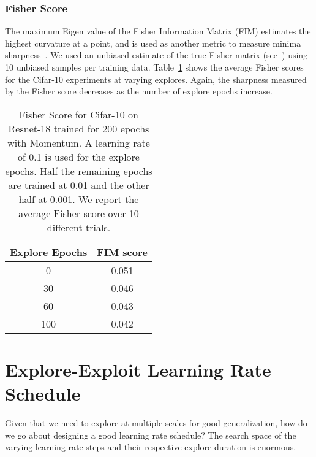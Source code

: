 \documentclass[twoside,11pt]{article}
\begin{document}
\subsubsection{\textbf{Fisher Score}}
The maximum Eigen value of the Fisher Information Matrix (FIM) estimates the highest curvature at a point, and is used as another metric to measure minima sharpness~\citep{fim2018information}. We used an unbiased estimate of the true Fisher matrix (see~\cite{empiricalfisher2019limitations}) using 10 unbiased samples per training data. Table~\ref{tab:fim_scores} shows the average Fisher scores for the Cifar-10 experiments at varying explores. Again, the sharpness measured by the Fisher score decreases as the number of explore epochs increase.

\begin{table}[hbt!]
\begin{minipage}{.6\textwidth}
    \caption{Fisher Score for Cifar-10 on Resnet-18 trained for 200
epochs with Momentum. A learning rate of 0.1 is used for the explore epochs. Half the remaining epochs are trained at 0.01 and the other half at 0.001. We report the average Fisher score over 10 different trials.}
\label{tab:fim_scores}
\end{minipage}\hfill
\begin{minipage}{.35\textwidth}\vspace*{0pt}\begin{tabular}{cc}
  \toprule
  Explore Epochs      &  FIM score   \\
\midrule
  0 & 0.051\\
  30 & 0.046\\
  60 & 0.043\\
  100 & 0.042\\
 \bottomrule
\end{tabular}
\end{minipage}
\end{table}

 























 \section{Explore-Exploit Learning Rate Schedule}
\label{explore-exploit schedule}
Given that we need to explore at multiple scales for good generalization, how do we go about designing a good learning rate schedule? The search space of the varying learning rate steps and their respective explore duration is enormous. 
\end{document}
